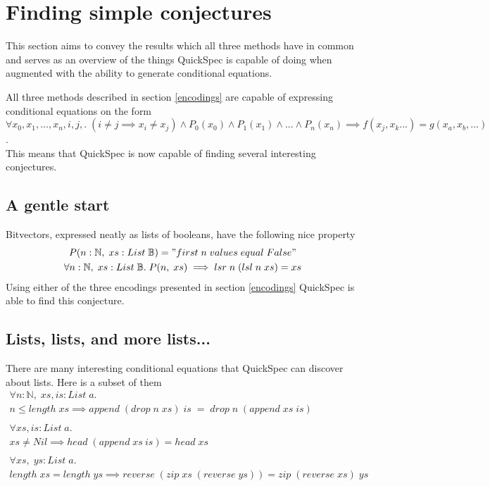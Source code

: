 \section{Finding simple conjectures}
This section aims to convey the results which
all three methods have in common and serves as an overview
of the things QuickSpec is capable of doing when augmented with
the ability to generate conditional equations.

All three methods described in section \ref{encodings}
are capable of expressing conditional equations on the form
\\$\forall x_0, x_1, ..., x_n, i, j,.\;(i \neq j \implies x_i \neq x_j)\wedge P_0(x_0) \wedge P_1(x_1) \wedge ... \wedge P_n(x_n) \implies f(x_j, x_k ...) = g(x_a, x_b, ...)$.\\
This means that QuickSpec is now capable of finding several
interesting conjectures.

\subsection{A gentle start} \label{bitvector}
    Bitvectors, expressed neatly as lists of booleans,
    have the following nice property
    \begin{gather*}
        P(n:\mathbb{N},\;xs:List\;\mathbb{B}) = "first\;n\;values\;equal\;False"\\
        \forall n:\mathbb{N},\;xs:List\;\mathbb{B}.\;P(n,\;xs)\implies lsr\;n\;(lsl\;n\;xs)=xs
    \end{gather*}
    Using either of the three encodings presented in section \ref{encodings} QuickSpec
    is able to find this conjecture.

\subsection{Lists, lists, and more lists...}
    There are many interesting conditional equations that
    QuickSpec can discover about lists. Here is a subset of them
    \begin{gather*}
        \forall n:\mathbb{N},\; xs, is:List\; a.\\
        n \leq length\; xs \implies append\; (drop\; n\; xs)\; is\; =\; drop\; n\; (append\; xs\; is)\\\\
        \forall xs, is:List\; a.\\
        xs \neq Nil \implies head\; (append\; xs\: is) = head\; xs\\\\
        \forall xs,\; ys:List\; a.\\
        length\; xs = length\; ys \implies reverse\; (zip\; xs\; (reverse\; ys)) = zip\; (reverse\; xs)\; ys
    \end{gather*}

